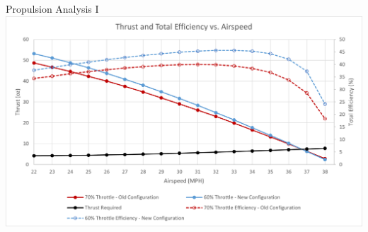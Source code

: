 \documentclass{beamer}
\begin{document}
    \begin{frame}{Propulsion Analysis I}
        \centering
        \includegraphics[width=1\linewidth]{figures/thrust_eff_vs_airspeed_comparisson.png}
    \end{frame}

\end{document}
